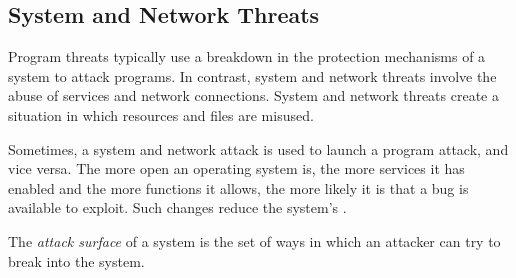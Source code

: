 \subsection{System and Network Threats}\label{subsec:System_Network_Threats}
Program threats typically use a breakdown in the protection mechanisms of a system to attack programs.
In contrast, system and network threats involve the abuse of services and network connections.
System and network threats create a situation in which  resources and  files are misused.

Sometimes, a system and network attack is used to launch a program attack, and vice versa.
The more open an operating system is, the more services it has enabled and the more functions it allows, the more likely it is that a bug is available to exploit.
Such changes reduce the system’s .

\begin{definition}\label{def:Attack_Surface}
  The \emph{attack surface} of a system is the set of ways in which an attacker can try to break into the system.
\end{definition}


